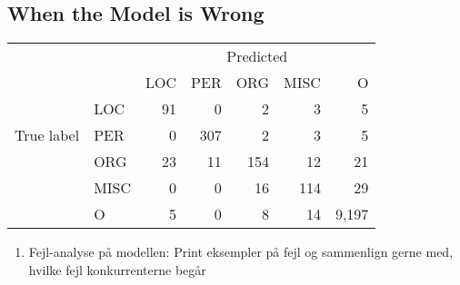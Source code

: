\documentclass[main.tex]{subfiles}
\begin{document}
\subsection{When the Model is Wrong}


\begin{table}[H]
    \centering
    \begin{tabular}{l l | r r r r r }
        & &	\multicolumn{5}{c}{Predicted}	\\
        \multirow{5}{*}{True label} & & LOC & PER & ORG & MISC & O \\\hline
        	& LOC  & 91 & 0    & 2   & 3   & 5   \\
            & PER  & 0  & 307  & 2   & 3   & 5   \\
            & ORG  & 23 & 11   & 154 & 12  & 21  \\
            & MISC & 0  & 0    & 16  & 114 & 29  \\
            & O    & 5  & 0    & 8   & 14  & 9,197
    \end{tabular}
\end{table}\noindent

\begin{enumerate}
    \item Fejl-analyse på modellen: Print eksempler på fejl og sammenlign gerne med, hvilke fejl konkurrenterne begår
\end{enumerate}
\end{document}
